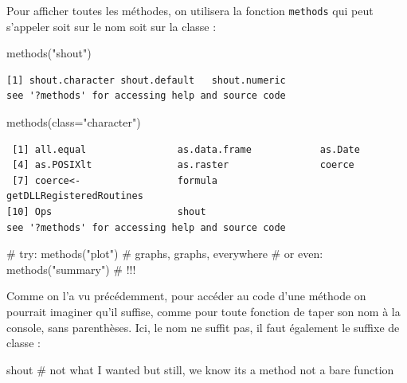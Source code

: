\documentclass[
  letterpaper,
  DIV=11,
  numbers=noendperiod]{scrreprt}
\newenvironment{Shaded}{\begin{snugshade}}{\end{snugshade}}
\newcommand{\AttributeTok}[1]{\textcolor[rgb]{0.40,0.45,0.13}{#1}}
\newcommand{\CommentTok}[1]{\textcolor[rgb]{0.37,0.37,0.37}{#1}}
\newcommand{\FunctionTok}[1]{\textcolor[rgb]{0.28,0.35,0.67}{#1}}
\newcommand{\NormalTok}[1]{\textcolor[rgb]{0.00,0.23,0.31}{#1}}
\newcommand{\StringTok}[1]{\textcolor[rgb]{0.13,0.47,0.30}{#1}}
\begin{document}
Pour afficher toutes les méthodes, on utilisera la fonction
\texttt{methods} qui peut s'appeler soit sur le nom soit sur la classe :

\begin{Shaded}
\begin{Highlighting}[]
\FunctionTok{methods}\NormalTok{(}\StringTok{"shout"}\NormalTok{)}
\end{Highlighting}
\end{Shaded}

\begin{verbatim}
[1] shout.character shout.default   shout.numeric  
see '?methods' for accessing help and source code
\end{verbatim}

\begin{Shaded}
\begin{Highlighting}[]
\FunctionTok{methods}\NormalTok{(}\AttributeTok{class=}\StringTok{"character"}\NormalTok{)}
\end{Highlighting}
\end{Shaded}

\begin{verbatim}
 [1] all.equal                as.data.frame            as.Date                 
 [4] as.POSIXlt               as.raster                coerce                  
 [7] coerce<-                 formula                  getDLLRegisteredRoutines
[10] Ops                      shout                   
see '?methods' for accessing help and source code
\end{verbatim}

\begin{Shaded}
\begin{Highlighting}[]
\CommentTok{\# try: methods("plot") \# graphs, graphs, everywhere}
\CommentTok{\# or even: methods("summary") \# !!!}
\end{Highlighting}
\end{Shaded}

Comme on l'a vu précédemment, pour accéder au code d'une méthode on
pourrait imaginer qu'il suffise, comme pour toute fonction de taper son
nom à la console, sans parenthèses. Ici, le nom ne suffit pas, il faut
également le suffixe de classe :

\begin{Shaded}
\begin{Highlighting}[]
\NormalTok{shout }\CommentTok{\# not what I wanted but still, we know it\textquotesingle{}s a method not a bare function}
\end{Highlighting}
\end{Shaded}
\end{document}
